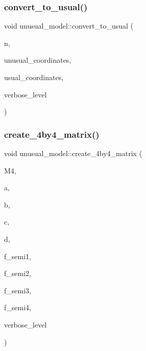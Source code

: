 \subsubsection{\texorpdfstring{convert\+\_\+to\+\_\+usual()}{convert\_to\_usual()}}
{\footnotesize\ttfamily void unusual\+\_\+model\+::convert\+\_\+to\+\_\+usual (\begin{DoxyParamCaption}\item[{\mbox{\hyperlink{galois_8h_a09fddde158a3a20bd2dcadb609de11dc}{I\+NT}}}]{n,  }\item[{\mbox{\hyperlink{galois_8h_a09fddde158a3a20bd2dcadb609de11dc}{I\+NT}} $\ast$}]{unusual\+\_\+coordinates,  }\item[{\mbox{\hyperlink{galois_8h_a09fddde158a3a20bd2dcadb609de11dc}{I\+NT}} $\ast$}]{usual\+\_\+coordinates,  }\item[{\mbox{\hyperlink{galois_8h_a09fddde158a3a20bd2dcadb609de11dc}{I\+NT}}}]{verbose\+\_\+level }\end{DoxyParamCaption})}

\mbox{\label{classunusual__model_a0c6fb4815d68e885a98c826a38852b42}} 
\subsubsection{\texorpdfstring{create\+\_\+4by4\+\_\+matrix()}{create\_4by4\_matrix()}}
{\footnotesize\ttfamily void unusual\+\_\+model\+::create\+\_\+4by4\+\_\+matrix (\begin{DoxyParamCaption}\item[{\mbox{\hyperlink{galois_8h_a09fddde158a3a20bd2dcadb609de11dc}{I\+NT}} $\ast$}]{M4,  }\item[{\mbox{\hyperlink{galois_8h_a09fddde158a3a20bd2dcadb609de11dc}{I\+NT}}}]{a,  }\item[{\mbox{\hyperlink{galois_8h_a09fddde158a3a20bd2dcadb609de11dc}{I\+NT}}}]{b,  }\item[{\mbox{\hyperlink{galois_8h_a09fddde158a3a20bd2dcadb609de11dc}{I\+NT}}}]{c,  }\item[{\mbox{\hyperlink{galois_8h_a09fddde158a3a20bd2dcadb609de11dc}{I\+NT}}}]{d,  }\item[{\mbox{\hyperlink{galois_8h_a09fddde158a3a20bd2dcadb609de11dc}{I\+NT}}}]{f\+\_\+semi1,  }\item[{\mbox{\hyperlink{galois_8h_a09fddde158a3a20bd2dcadb609de11dc}{I\+NT}}}]{f\+\_\+semi2,  }\item[{\mbox{\hyperlink{galois_8h_a09fddde158a3a20bd2dcadb609de11dc}{I\+NT}}}]{f\+\_\+semi3,  }\item[{\mbox{\hyperlink{galois_8h_a09fddde158a3a20bd2dcadb609de11dc}{I\+NT}}}]{f\+\_\+semi4,  }\item[{\mbox{\hyperlink{galois_8h_a09fddde158a3a20bd2dcadb609de11dc}{I\+NT}}}]{verbose\+\_\+level }\end{DoxyParamCaption})}

